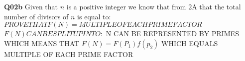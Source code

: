 \documentclass[11pt]{article}
\begin{document}
\textbf{Q02b} Given that $n$ is a positive integer we know that from 2A that the total number of divisors of $n$ is equal to:
$PROVE THAT F(N) = MULTIPLE OF EACH PRIME FACTOR$
$F(N) CAN BE SPLIT UP INTO:$
N CAN BE REPRESENTED BY PRIMES WHICH MEANS THAT
$F(N) = F(P_1) f(p_2)$
WHICH EQUALS MULTIPLE OF EACH PRIME FACTOR
\end{document}
